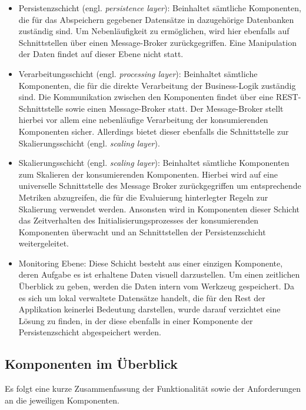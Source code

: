 \begin{itemize}
  \item Persistenzschicht (engl. \emph{persistence layer}): Beinhaltet sämtliche Komponenten, die für das Abspeichern gegebener Datensätze in dazugehörige Datenbanken zuständig sind. Um Nebenläufigkeit zu ermöglichen, wird hier ebenfalls auf Schnittstellen über einen Message-Broker zurückgegriffen. Eine Manipulation der Daten findet auf dieser Ebene nicht statt.
  \item Verarbeitungsschicht (engl. \emph{processing layer}): Beinhaltet sämtliche Komponenten, die für die direkte Verarbeitung der Business-Logik zuständig sind. Die Kommunikation zwischen den Komponenten findet über eine REST-Schnittstelle sowie einen Message-Broker statt. Der Message-Broker stellt hierbei vor allem eine nebenläufige Verarbeitung der konsumierenden Komponenten sicher. Allerdings bietet dieser ebenfalls die Schnittstelle zur Skalierungsschicht (engl. \emph{scaling layer}).
  \item Skalierungsschicht (engl. \emph{scaling layer}): Beinhaltet sämtliche Komponenten zum Skalieren der konsumierenden Komponenten. Hierbei wird auf eine universelle Schnittstelle des Message Broker zurückgegriffen um entsprechende Metriken abzugreifen, die für die Evaluierung hinterlegter Regeln zur Skalierung verwendet werden. Ansonsten wird in Komponenten dieser Schicht das Zeitverhalten des Initialisierungsprozesses der konsumierenden Komponenten überwacht und an Schnittstellen der Persistenzschicht weitergeleitet.
  \item Monitoring Ebene: Diese Schicht besteht aus einer einzigen Komponente, deren Aufgabe es ist erhaltene Daten visuell darzustellen. Um einen zeitlichen Überblick zu geben, werden die Daten intern vom Werkzeug gespeichert. Da es sich um lokal verwaltete Datensätze handelt, die für den Rest der Applikation keinerlei Bedeutung darstellen, wurde darauf verzichtet eine Lösung zu finden, in der diese ebenfalls in einer Komponente der Persistenzschicht abgespeichert werden.
\end{itemize}

\newpage

\subsection{Komponenten im Überblick}
Es folgt eine kurze Zusammenfassung der Funktionalität sowie der Anforderungen an die jeweiligen Komponenten.

